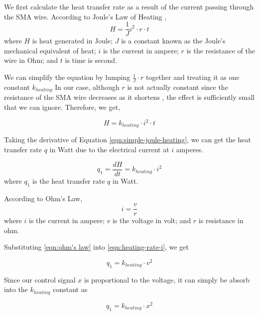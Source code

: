 We first calculate the heat transfer rate as a result of the current passing through the SMA wire. According to Joule's Law of Heating \cite{JouleHeating},
\begin{equation}
	H = \frac{1}{J}i^2 \cdot r \cdot t
\end{equation}
where $H$ is heat generated in Joule; $J$ is a constant known as the Joule's mechanical equivalent of heat; $i$ is the current in ampere; $r$ is the resistance of the wire in Ohm; and $t$ is time is second.

We can simplify the equation by lumping $\frac{1}{J}\cdot r$ together and treating it as one constant $k_{heating}$
In our case, although $r$ is not actually constant since the resistance of the SMA wire decreases as it shortens \cite{FlexinolTechSpecs}, the effect is sufficiently small that we can ignore. Therefore, we get,

\begin{equation}\label{eqn:simple-joule-heating}
H = k_{heating} \cdot i^2 \cdot t
\end{equation}

Taking the derivative of Equation \eqref{eqn:simple-joule-heating}, we can get the heat transfer rate $q$ in Watt due to the electrical current at $i$ amperes. 

\begin{equation}\label{eqn:heating-rate-i}
	q_1 = \frac{dH}{dt} = k_{heating} \cdot i^2
\end{equation}
where $q_1$ is the heat transfer rate $q$ in Watt.

According to Ohm's Law, 
\begin{equation}\label{eqn:ohm's law}
	i = \frac{v}{r}
\end{equation}
where $i$ is the current in ampere; $v$ is the voltage in volt; and $r$ is resistance in ohm.

Substituting \eqref{eqn:ohm's law} into \eqref{eqn:heating-rate-i}, we get

\begin{equation}\label{eqn:heating-rate-v}
q_1 = k_{heating} \cdot v^2
\end{equation}

Since our control signal $x$ is proportional to the voltage, it can simply be absorb into the $k_{heating}$ constant as 

\begin{equation}\label{eqn:heating-rate-x}
q_1 = k_{heating} \cdot x^2
\end{equation}

